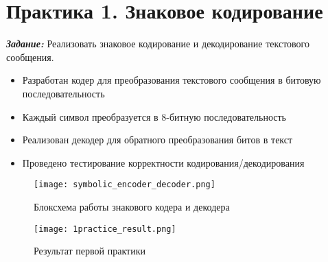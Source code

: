 \chapter*{Практика 1. Знаковое кодирование}
\label{ch:1_practice}

\textit{\textbf{Задание:}} Реализовать знаковое кодирование и декодирование текстового сообщения.

\begin{itemize}
    \item Разработан кодер для преобразования текстового сообщения в битовую последовательность
    \item Каждый символ преобразуется в 8-битную последовательность
    \item Реализован декодер для обратного преобразования битов в текст
    \item Проведено тестирование корректности кодирования/декодирования
\end{itemize}

\begin{figure}[ht]
    \centering
    \texttt{[image: symbolic\_encoder\_decoder.png]}
    \caption{Блоксхема работы знакового кодера и декодера}
    \label{fig:symbolic_encoder_decoder}
\end{figure}

\begin{figure}[ht]
    \centering
    \texttt{[image: 1practice\_result.png]}
    \caption{Результат первой практики}
    \label{fig:1practice_result}
\end{figure}